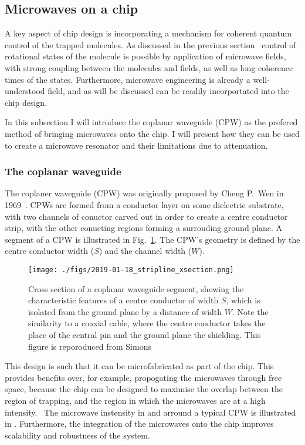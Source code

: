 
\subsection{Microwaves on a chip}

A key aspect of chip design is incorporating a mechanism for coherent quantum
control of the trapped molecules. As discussed in the previous section~ control of rotational states of the molecule is possible
by application of microwave fields, with strong coupling between the molecules
and fields, as well as long coherence times of the states.\cite{Blackmore_2018}
Furthermore, microwave engineering is already a well-understood field, and as
will be discussed can be readily incorportated into the chip design. 

In this subsection I will introduce the coplanar waveguide (CPW) as the
prefered method of bringing microwaves onto the chip. I will present how they
can be used to create a microwave resonator and their limitations due to
attenuation.

\subsubsection{The coplanar waveguide}

The coplaner waveguide (CPW) was originally proposed by Cheng P.~Wen in
1969~\cite{1127105}. CPWs are formed from a conductor layer on some dielectric
substrate, with two channels of conuctor carved out in order to create a centre
conductor strip, with the other conucting regions forming a surrouding ground
plane.
%
A segment of a CPW is illustrated in Fig.~\ref{experiment:fig:CPWxsec}. The
CPW's geometry is defined by the centre conductor width ($S$) and the channel
width ($W$). 
\begin{figure}
  \texttt{[image: ./figs/2019-01-18\_stripline\_xsection.png]}
  \caption{
    Cross section of a coplanar waveguide segment, showing the characteristic
    features of a centre conductor of width $S$, which is isolated from the
    ground plane by a distance of width $W$. Note the similarity to a coaxial
    cable, where the centre conductor takes the place of the central pin and the
    ground plane the shielding. This figure is reporoduced from
    Simons~\cite{Simons2004}}
  \label{experiment:fig:CPWxsec}
\end{figure}

This design is such that it can be microfabricated as part of the chip.  This
provides benefits over, for example, propogating the microwaves through free
space, because the chip can be designed to maximise the overlap between the
region of trapping, and the region in which the microwaves are at a high
intensity.~ The microwave instensity in and arround a typical CPW
is illustrated in . Furthermore, the
integration of the microwaves onto the chip improves scalability and robustness
of the system.

